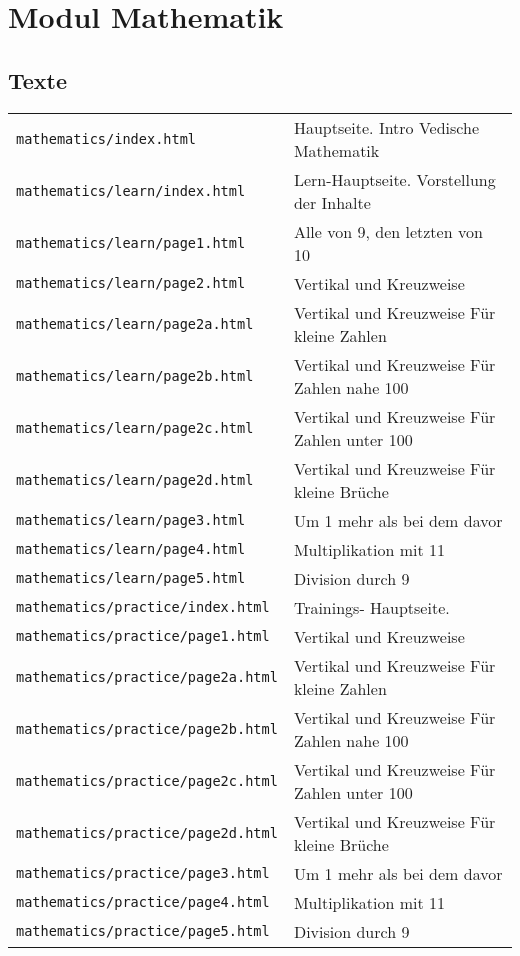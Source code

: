 \section{Modul Mathematik}
\subsection{Texte}
\begin{tabular}{ | p{} | p{} | } 
	\texttt{mathematics/index.html}	& Hauptseite. Intro Vedische Mathematik\\
	\texttt{mathematics/learn/index.html}	& Lern-Hauptseite. Vorstellung der Inhalte\\
	\texttt{mathematics/learn/page1.html}	& Alle von 9, den letzten von 10\\
	\texttt{mathematics/learn/page2.html}	& Vertikal und Kreuzweise\\
	\texttt{mathematics/learn/page2a.html}	& Vertikal und Kreuzweise Für kleine Zahlen\\
	\texttt{mathematics/learn/page2b.html}	& Vertikal und Kreuzweise Für Zahlen nahe 100\\
	\texttt{mathematics/learn/page2c.html}	& Vertikal und Kreuzweise Für Zahlen unter 100\\
	\texttt{mathematics/learn/page2d.html}	& Vertikal und Kreuzweise Für kleine Brüche\\
	\texttt{mathematics/learn/page3.html}	& Um 1 mehr als bei dem davor\\
	\texttt{mathematics/learn/page4.html}	& Multiplikation mit 11\\
	\texttt{mathematics/learn/page5.html}	& Division durch 9\\
	\texttt{mathematics/practice/index.html}	& Trainings- Hauptseite.\\
	\texttt{mathematics/practice/page1.html}	& Vertikal und Kreuzweise\\
	\texttt{mathematics/practice/page2a.html}	& Vertikal und Kreuzweise Für kleine Zahlen\\
	\texttt{mathematics/practice/page2b.html}	& Vertikal und Kreuzweise Für Zahlen nahe 100\\
	\texttt{mathematics/practice/page2c.html}	& Vertikal und Kreuzweise Für Zahlen unter 100\\
	\texttt{mathematics/practice/page2d.html}	& Vertikal und Kreuzweise Für kleine Brüche\\
	\texttt{mathematics/practice/page3.html}	& Um 1 mehr als bei dem davor\\
	\texttt{mathematics/practice/page4.html}	& Multiplikation mit 11\\
	\texttt{mathematics/practice/page5.html}	& Division durch 9\\
\end{tabular}

